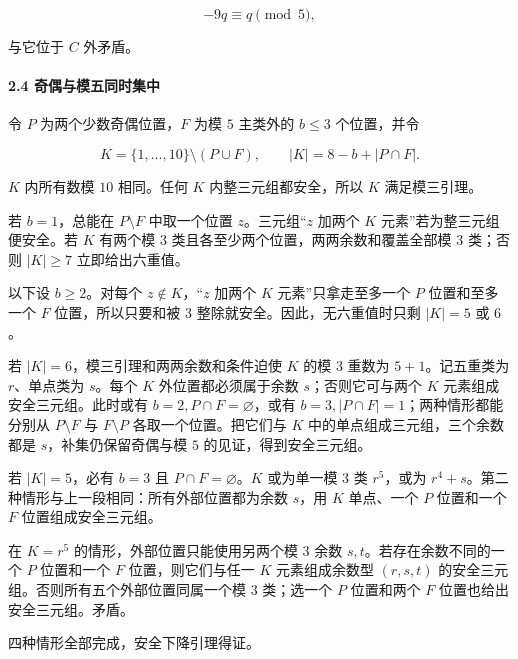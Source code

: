 \documentclass[11pt,a4paper]{article}
\theoremstyle{definition}
\numberwithin{equation}{section}
\begin{document}
\[
-9q\equiv q\pmod5,
\]

{与它位于} \(C\) {外矛盾。}

\paragraph*{\texorpdfstring{{2.4} {奇偶与模五同时集中}}{2.4 奇偶与模五同时集中}}\label{C35-h234}

{令} \(P\) {为两个少数奇偶位置，}\(F\) {为模} \(5\) {主类外的} \(b\le3\) {个位置，并令}

\[
K=\{1,\ldots,10\}\setminus(P\cup F),\qquad
|K|=8-b+|P\cap F|.
\]

\(K\) {内所有数模} \(10\) {相同。任何} \(K\) {内整三元组都安全，所以} \(K\) {满足模三引理。}

{若} \(b=1\){，总能在} \(P\setminus F\) {中取一个位置} \(z\){。三元组``}\(z\) {加两个} \(K\) {元素''若为整三元组便安全。若} \(K\) {有两个模} \(3\) {类且各至少两个位置，两两余数和覆盖全部模} \(3\) {类；否则} \(|K|\ge7\) {立即给出六重值。}

{以下设} \(b\ge2\){。对每个} \(z\notin K\){，``}\(z\) {加两个} \(K\) {元素''只拿走至多一个} \(P\) {位置和至多一个} \(F\) {位置，所以只要和被} \(3\) {整除就安全。因此，无六重值时只剩} \(|K|=5\) {或} \(6\){。}

{若} \(|K|=6\){，模三引理和两两余数和条件迫使} \(K\) {的模} \(3\) {重数为} \(5+1\){。记五重类为} \(r\){、单点类为} \(s\){。每个} \(K\) {外位置都必须属于余数} \(s\){；否则它可与两个} \(K\) {元素组成安全三元组。此时或有} \(b=2,P\cap F=\varnothing\){，或有} \(b=3,|P\cap F|=1\){；两种情形都能分别从} \(P\setminus F\) {与} \(F\setminus P\) {各取一个位置。把它们与} \(K\) {中的单点组成三元组，三个余数都是} \(s\){，补集仍保留奇偶与模} \(5\) {的见证，得到安全三元组。}

{若} \(|K|=5\){，必有} \(b=3\) {且} \(P\cap F=\varnothing\){。}\(K\) {或为单一模} \(3\) {类} \(r^5\){，或为} \(r^4+s\){。第二种情形与上一段相同：所有外部位置都为余数} \(s\){，用} \(K\) {单点、一个} \(P\) {位置和一个} \(F\) {位置组成安全三元组。}

{在} \(K=r^5\) {的情形，外部位置只能使用另两个模} \(3\) {余数} \(s,t\){。若存在余数不同的一个} \(P\) {位置和一个} \(F\) {位置，则它们与任一} \(K\) {元素组成余数型} \((r,s,t)\) {的安全三元组。否则所有五个外部位置同属一个模} \(3\) {类；选一个} \(P\) {位置和两个} \(F\) {位置也给出安全三元组。矛盾。}

{四种情形全部完成，安全下降引理得证。}
\end{document}
